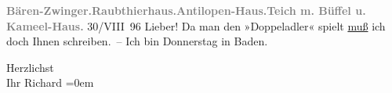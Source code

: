 \pstart
           \centering{}\textcolor{gray}{\textbf{Bären-Zwinger.}}\hspace*{1.5em}\textcolor{gray}{\textbf{Raubthierhaus.}}\hspace*{1.5em}\textcolor{gray}{\textbf{Antilopen-Haus.}}\hspace*{2em}\textcolor{gray}{\textbf{Teich m. Büffel u. Kameel-Haus.}}\pend
           \vspace{1em}
\pstart
           \raggedleft{}{\pb}30/VIII 96\pend
           \vspace{0.5em}
\pstart
           Lieber! Da man den »Doppeladler« spielt \uline{muß} ich doch Ihnen
               schreiben. – Ich bin Donnerstag in Baden.\pend
           
\pstart
           Herzlichst{\\[\baselineskip]}Ihr \spacefill\mbox{Richard}\pend
           \leftskip=0em{}\endnumbering{}  \newcommand{\dateiname}{L00581}\newcommand{\titel}{Richard Beer-Hofmann an Arthur Schnitzler, 30. 8. 1896}\newcommand{\editorInnen}{Martin Anton Müller und Gerd-Hermann Susen}
